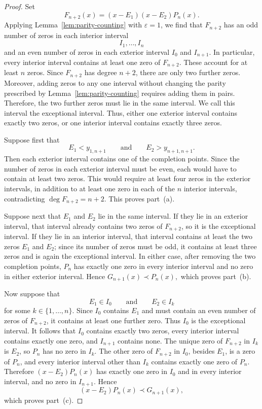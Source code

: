 \documentclass[final,3p,times,12pt]{elsarticle}
\numberwithin{equation}{section}  %
\begin{document}
\begin{proof}
Set
\[
F_{n+2}(x)=(x-E_1)(x-E_2)P_n(x).
\]
Applying Lemma~\ref{lem:parity-counting} with $\varepsilon=1$, we find that $F_{n+2}$
has an odd number of zeros in each interior interval
\[
I_1,\ldots,I_n
\]
and an even number of zeros in each exterior interval $I_0$ and
$I_{n+1}$. In particular, every interior interval contains at least one zero of
$F_{n+2}$. These account for at least $n$ zeros. Since
$F_{n+2}$ has degree $n+2$, there are only two further zeros.
Moreover, adding zeros to any one interval without changing the parity
prescribed by Lemma~\ref{lem:parity-counting} requires adding them in pairs. Therefore, the
two further zeros must lie in the same interval. We call this interval
the exceptional interval. Thus, either one exterior interval contains
exactly two zeros, or one interior interval contains exactly three
zeros. 

\medskip \noindent Suppose first that
\[
E_1<y_{1,n+1}
\qquad\text{and}\qquad
E_2>y_{n+1,n+1}.
\]
Then each exterior interval contains one of the completion points.
Since the number of zeros in each exterior interval must be even, each
would have to contain at least two zeros. This would require at least
four zeros in the exterior intervals, in addition to at least one zero
in each of the $n$ interior intervals, contradicting
$\deg F_{n+2}=n+2$. This proves part~(a).

\medskip \noindent Suppose next that $E_1$ and $E_2$ lie in the same interval. If they
lie in an exterior interval, that interval already contains two zeros
of $F_{n+2}$, so it is the exceptional interval. If they lie in an
interior interval, that interval contains at least the two zeros
$E_1$ and $E_2$; since its number of zeros must be odd, it contains
at least three zeros and is again the exceptional interval. In
either case, after removing the two completion points, $P_n$ has
exactly one zero in every interior interval and no zero in either
exterior interval. Hence $G_{n+1}(x)\prec P_n(x),$ which proves part~(b).



\medskip \noindent Now suppose that
\[
E_1\in I_0
\qquad\text{and}\qquad
E_2\in I_k
\]
for some $k\in\{1,\ldots,n\}$. Since $I_0$ contains $E_1$ and
must contain an even number of zeros of $F_{n+2}$, it contains at
least one further zero. Thus $I_0$ is the exceptional interval.
It follows that $I_0$ contains exactly two zeros, every interior
interval contains exactly one zero, and $I_{n+1}$ contains none. The unique zero of $F_{n+2}$ in $I_k$ is $E_2$, so $P_n$ has no
zero in $I_k$. The other zero of $F_{n+2}$ in $I_0$, besides
$E_1$, is a zero of $P_n$, and every interior interval other than
$I_k$ contains exactly one zero of $P_n$. Therefore
$(x-E_2)P_n(x)$ has exactly one zero in $I_0$ and in every interior
interval, and no zero in $I_{n+1}$. Hence
\[
(x-E_2)P_n(x)\prec G_{n+1}(x),
\]
which proves part~(c).


\end{proof}
\end{document}

